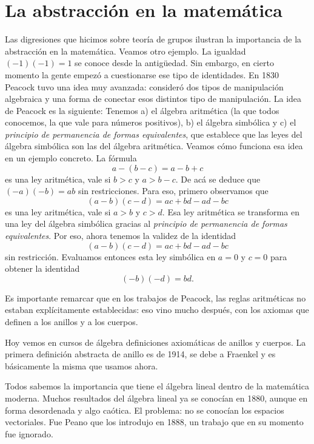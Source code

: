 \section*{La abstracción en la matemática}

Las digresiones que hicimos sobre teoría de grupos ilustran la importancia de la abstracción en la matemática. Veamos otro ejemplo. La igualdad $(-1)(-1)=1$ se conoce
desde la antigüedad. Sin embargo, en cierto momento la gente empezó a cuestionarse
ese tipo de identidades. En 1830 Peacock tuvo una idea muy avanzada: consideró dos tipos de manipulación algebraica y una forma de conectar esos distintos tipo de manipulación. La idea de Peacock es la siguiente: Tenemos a) el álgebra aritmética (la que todos conocemos, la que vale para números positivos), b) el álgebra simbólica y c) el \emph{principio de permanencia de formas equivalentes}, que establece que las leyes del álgebra simbólica son las del álgebra aritmética.  Veamos cómo funciona esa idea en un ejemplo concreto. La fórmula
\[
a-(b-c)=a-b+c
\]
es una ley aritmética, vale si $b>c$ y $a>b-c$. De acá se deduce que
$(-a)(-b)=ab$ sin restricciones. Para eso, 
primero observamos que 
\[
(a-b)(c-d)=ac+bd-ad-bc
\]
es una ley aritmética, vale si $a>b$ y $c>d$. Esa ley aritmética
se transforma en una ley del álgebra simbólica gracias al 
\emph{principio de permanencia de formas equivalentes}. Por eso, 
ahora tenemos la validez de la identidad 
\[
(a-b)(c-d)=ac+bd-ad-bc
\]
sin restricción. Evaluamos entonces esta ley simbólica en $a=0$ y $c=0$ 
para obtener la identidad
\[
(-b)(-d)=bd.
\]

Es importante remarcar que en los trabajos de Peacock, las reglas aritméticas
no estaban explícitamente establecidas: eso vino mucho después, con los axiomas
que definen a los anillos y a los cuerpos.  

Hoy vemos en cursos de álgebra definiciones axiomáticas de anillos
y cuerpos. La primera definición abstracta de anillo 
es de 1914, se debe a Fraenkel y es básicamente la misma que usamos
ahora. 

Todos sabemos la importancia que tiene el álgebra lineal 
dentro de la matemática moderna. Muchos resultados del álgebra
lineal ya se conocían en 1880, aunque en forma desordenada y algo caótica. 
El problema: no se conocían los espacios vectoriales. Fue Peano
que los introdujo en 1888, un trabajo que en su momento 
fue ignorado. 

